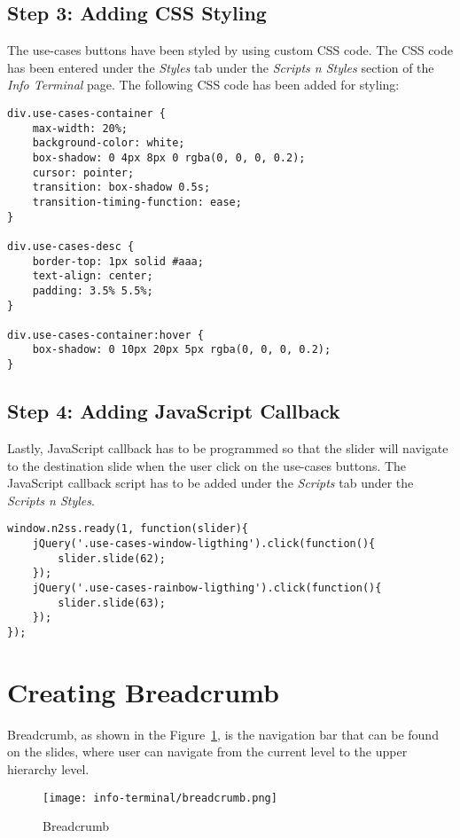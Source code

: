 \subsection*{Step 3: Adding CSS Styling}
The use-cases buttons have been styled by using custom CSS code. The CSS code has been entered under the \emph{Styles} tab under the \emph{Scripts n Styles} section of the \emph{Info Terminal} page. The following CSS code has been added for styling:
\begin{lstlisting}
div.use-cases-container {
	max-width: 20%;
	background-color: white;
	box-shadow: 0 4px 8px 0 rgba(0, 0, 0, 0.2);
	cursor: pointer;
	transition: box-shadow 0.5s;
	transition-timing-function: ease;
}

div.use-cases-desc {
	border-top: 1px solid #aaa;
	text-align: center;
	padding: 3.5% 5.5%;
}

div.use-cases-container:hover {
	box-shadow: 0 10px 20px 5px rgba(0, 0, 0, 0.2);
}
\end{lstlisting}

\subsection*{Step 4: Adding JavaScript Callback}
Lastly, JavaScript callback has to be programmed so that the slider will navigate to the destination slide when the user click on the use-cases buttons. The JavaScript callback script has to be added under the \emph{Scripts} tab under the \emph{Scripts n Styles}.

\begin{lstlisting}
window.n2ss.ready(1, function(slider){
	jQuery('.use-cases-window-ligthing').click(function(){
		slider.slide(62);
	});
	jQuery('.use-cases-rainbow-ligthing').click(function(){
		slider.slide(63);
	});
});
\end{lstlisting}

\section{Creating Breadcrumb}
Breadcrumb, as shown in the Figure~\ref{fig:breadcrumb}, is the navigation bar that can be found on the slides, where user can navigate from the current level to the upper hierarchy level.

\begin{figure}[ht]
\caption{Breadcrumb}
\label{fig:breadcrumb}
\centering
\texttt{[image: info-terminal/breadcrumb.png]}
\end{figure}

